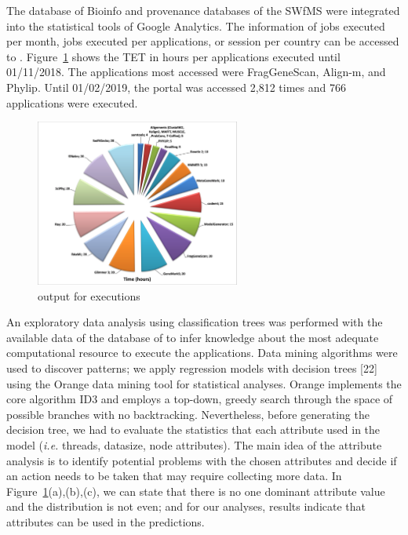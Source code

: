 The database of Bioinfo and provenance databases of the SWfMS were integrated into the statistical tools of Google Analytics. The information of jobs executed per month, jobs executed per applications, or session per country can be accessed to \system. Figure~\ref{fig:bioinfoTET} shows the TET in hours per applications executed until 01/11/2018. The applications most accessed were FragGeneScan, Align-m, and Phylip. Until 01/02/2019, the portal was accessed 2,812 times and 766 applications were executed.

\begin{figure}[!htb]
\centering
\includegraphics[width=0.6\textwidth]{imgs/bioinfoTET.png}
\vspace{-12px}
\caption{\system output for \swift executions}
\label{fig:bioinfoTET}
\end{figure}

An exploratory data analysis using classification trees was performed with the available data of the database of \system to infer knowledge about the most adequate computational resource to execute the applications. Data mining algorithms were used to discover patterns; we apply regression models with decision trees [22] using the Orange data mining tool for statistical analyses. Orange implements the core algorithm ID3 and employs a top-down, greedy search through the space of possible branches with no backtracking. Nevertheless, before generating the decision tree, we had to evaluate the statistics that each attribute used in the model (\textit{i.e.} threads, datasize, node attributes). The main idea of the attribute analysis is to identify potential problems with the chosen attributes and decide if an action needs to be taken that may require collecting more data. In Figure~\ref{fig:bioinfoTET}(a),(b),(c), we can state that there is no one dominant attribute value and the distribution is not even; and for our analyses, results indicate that attributes can be used in the predictions.


